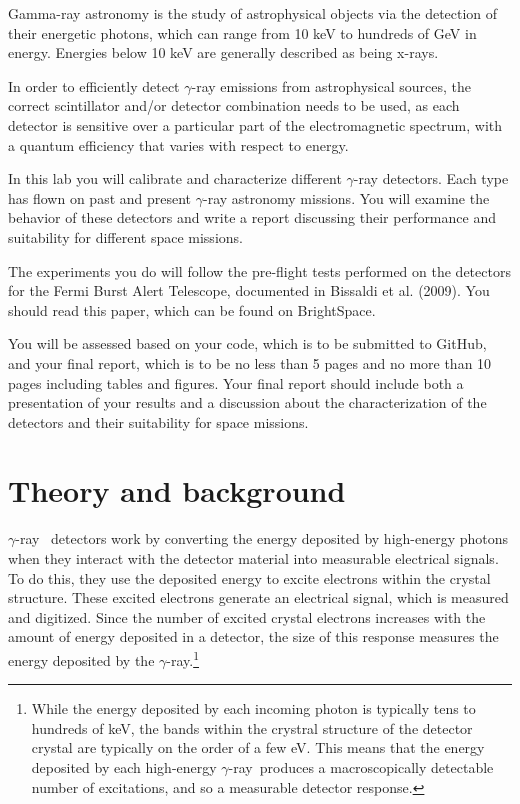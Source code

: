 \documentclass{tufte-book}
\newcommand{\textgamma}{\ensuremath{\gamma}} %
\newcommand{\gmray}{\ensuremath{\gamma}-ray}
\begin{document}
Gamma-ray astronomy is the study of astrophysical objects via the detection of their energetic photons, which can range from 10 keV to hundreds of GeV in energy. Energies below 10 keV are generally described as being x-rays.

In order to efficiently detect \textgamma-ray emissions from astrophysical sources, the correct scintillator and/or detector combination needs to be used, as each detector is sensitive over a particular part of the electromagnetic spectrum, with a quantum efficiency that varies with respect to energy.

In this lab you will calibrate and characterize different \textgamma-ray detectors. Each type has flown on past and present \textgamma-ray astronomy missions. You will examine the behavior of these detectors and write a report discussing their performance and suitability for different space missions.

The experiments you do will follow the pre-flight tests performed on the detectors for the Fermi Burst Alert Telescope, documented in Bissaldi et al. (2009). You should read this paper, which can be found on BrightSpace. 

You will be assessed based on your code, which is to be submitted to GitHub, and your final report, which is to be no less than 5 pages and no more than 10 pages including tables and figures. Your final report should include both a presentation of your results and a discussion about the characterization of the detectors and their suitability for space missions.

\section{Theory and background}

\gmray~ detectors work by converting the energy deposited by high-energy photons when they interact with the detector material into measurable electrical signals. To do this, they use the deposited energy to excite electrons within the crystal structure. These excited electrons generate an electrical signal, which is measured and digitized. Since the number of excited crystal electrons increases with the amount of energy deposited in a detector, the size of this response measures the energy deposited by the \gmray.\footnote{While the energy deposited by each incoming photon is typically tens to hundreds of keV, the bands within the crystral structure of the detector crystal are typically on the order of a few eV. This means that the energy deposited by each high-energy \gmray\, produces a macroscopically detectable number of excitations, and so a measurable detector response.}
\end{document}
